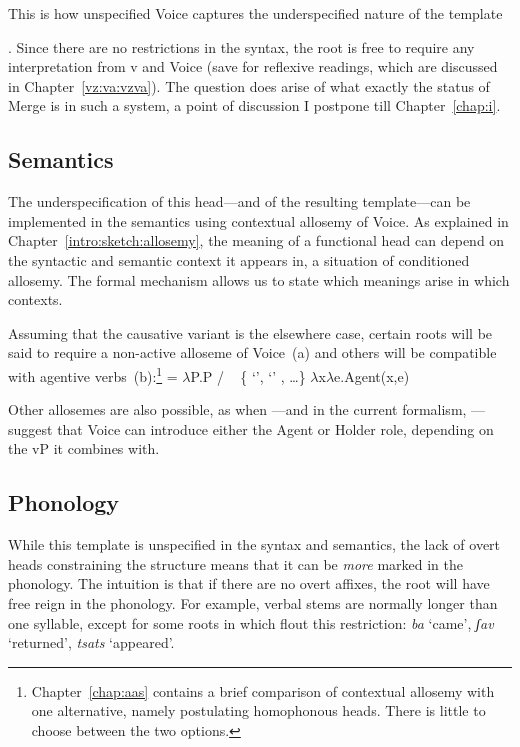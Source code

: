 This is how unspecified Voice captures the underspecified nature of the template {\tkal. Since there are no restrictions in the syntax, the root is free to require any interpretation from v and Voice (save for reflexive readings, which are discussed in Chapter~\ref{vz:va:vzva}). The question does arise of what exactly the status of Merge is in such a system, a point of discussion I postpone till Chapter~\ref{chap:i}.

		
		\subsection{Semantics} \label{voice:voice:sem}
The underspecification of this head---and of the resulting template---can be implemented in the semantics using contextual allosemy of Voice. As explained in Chapter~\ref{intro:sketch:allosemy}, the meaning of a functional head can depend on the syntactic and semantic context it appears in, a situation of conditioned allosemy. The formal mechanism allows us to state which meanings arise in which contexts.

Assuming that the causative variant is the elsewhere case, certain roots will be said to require a non-active alloseme of Voice~(\nextx a) and others will be compatible with agentive verbs~(\nextx b):\footnote{Chapter~\ref{chap:aas} contains a brief comparison of contextual allosemy with one alternative, namely postulating homophonous heads. There is little to choose between the two options.}
\pex {} = 
	\a $\lambda$P.P \phantom{agent(x,e)xxx} / \trace~ \{  `',  `' , \dots \}
	\a $\lambda$x$\lambda$e.Agent(x,e)
\xe

Other allosemes are also possible, as when \cite{kratzer96}---and in the current formalism, \cite{woodmarantz17}---suggest that Voice can introduce either the Agent or Holder role, depending on the vP it combines with.
		
		\subsection{Phonology} \label{voice:voice:phono}
While this template is unspecified in the syntax and semantics, the lack of overt heads constraining the structure means that it can be \emph{more} marked in the phonology. The intuition is that if there are no overt affixes, the root will have free reign in the phonology. For example, verbal stems are normally longer than one syllable, except for some roots in {\tkal} which flout this restriction:
\ex \emph{ba} `came', \emph{ʃav} `returned', \emph{tsats} `appeared'.
\xe

}
